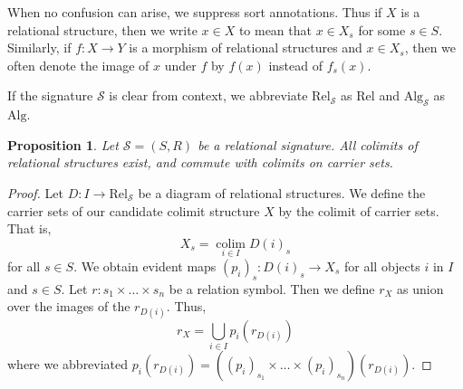 \documentclass[a4paper]{article}
\newtheorem{proposition}[theorem]{Proposition}
\theoremstyle{remark}
\theoremstyle{definition}
\begin{document}
When no confusion can arise, we suppress sort annotations.
Thus if $X$ is a relational structure, then we write $x \in X$ to mean that $x \in X_s$ for some $s \in S$.
Similarly, if $f : X \rightarrow Y$ is a morphism of relational structures and $x \in X_s$, then we often denote the image of $x$ under $f$ by $f(x)$ instead of $f_s(x)$.

If the signature $\mathcal{S}$ is clear from context, we abbreviate $\mathrm{Rel}_\mathcal{S}$ as $\mathrm{Rel}$ and $\mathrm{Alg}_\mathcal{S}$ as $\mathrm{Alg}$.

\begin{proposition}
  \label{prop:rel-cocomplete}
  Let $\mathcal{S} = (S, R)$ be a relational signature.
  All colimits of relational structures exist, and commute with colimits on carrier sets.
\end{proposition}
\begin{proof}
  Let $D : I \rightarrow \mathrm{Rel}_\mathcal{S}$ be a diagram of relational structures.
  We define the carrier sets of our candidate colimit structure $X$ by the colimit of carrier sets.
  That is,
  \begin{equation}
    X_s = \operatorname*{colim}_{i \in I} D(i)_s
  \end{equation}
  for all $s \in S$.
  We obtain evident maps $(p_i)_s : D(i)_s \rightarrow X_s$ for all objects $i$ in $I$ and $s \in S$.
  Let $r : s_1 \times \dots \times s_n$ be a relation symbol.
  Then we define $r_X$ as union over the images of the $r_{D(i)}$.
  Thus,
  \begin{equation}
    r_X = \bigcup_{i \in I} p_i(r_{D(i)})
  \end{equation}
  where we abbreviated $p_i(r_{D(i)}) = ((p_i)_{s_1} \times \dots \times (p_i)_{s_n})(r_{D(i)})$.
\end{proof}
\end{document}
